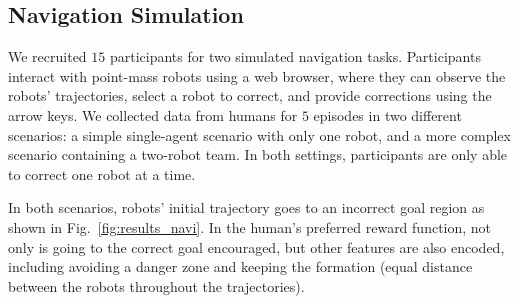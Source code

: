

	



	

\vspace{-1em}
\subsection{Navigation Simulation}
\label{sec:exp_navigation}
We recruited $15$ participants for two simulated navigation tasks. Participants interact with point-mass robots using a web browser, where they can observe the robots' trajectories, select a robot to correct, and provide corrections using the arrow keys.
We collected data from humans for $5$ episodes in two different scenarios: a simple single-agent scenario with only one robot, and  a more complex scenario containing a two-robot team. 
In both settings, participants are only able to correct one robot at a time.


In both scenarios, robots' initial trajectory goes to an incorrect goal region as shown in Fig.~\ref{fig:results_navi}.
In the human's preferred reward function, not only is going to the correct goal encouraged, but other features are also encoded, including avoiding a danger zone and keeping the formation (equal distance between the robots throughout the trajectories). 


